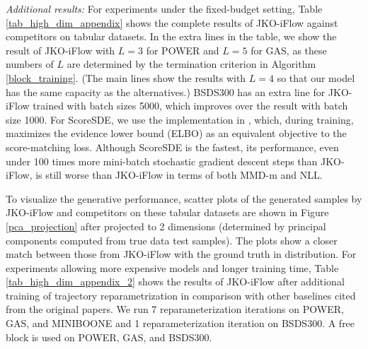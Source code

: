 \documentclass{article}
\theoremstyle{remark}
\theoremstyle{plain}
\newcommand{\JKO}{JKO-iFlow}
\begin{document}
{%
\begin{table}[!b]
\begin{center}
\caption{
NLL per noise scheduler and $\bar{\beta}_{\max}$ combination of ScoreSDE on MINIBOONE. The three settings ``linear, constant, quadratic'' follow the DDPM suggestion \citep{ho2020denoising}. The mean and standard deviation are computed over three replicas of the trained model.
}
\label{tab_noise_schedule}
\def\arraystretch{1}
\end{center}
\end{table}

\vspace{5pt}
\noindent 
\textit{Additional results:}
%
For experiments under the fixed-budget setting, 
Table \ref{tab_high_dim_appendix} shows the complete results of \JKO{} against competitors on tabular datasets.
%
In the extra lines in the table,
we show the result of \JKO{} with $L=3$ for POWER
and $L=5$ for GAS, as these numbers of $L$ are determined by the termination criterion in Algorithm \ref{block_training}.
(The main lines show the results with $L=4$ so that our model has the same capacity as the alternatives.)
BSDS300 has an extra line for \JKO{} trained with batch sizes 5000,
which improves over the result with batch size 1000.
%
For ScoreSDE, we use the implementation in \citep{huang2021variational}, which, during training, maximizes the evidence lower bound (ELBO) as an equivalent objective to the score-matching loss.
%
Although ScoreSDE is the fastest, its performance, even under 100 times more mini-batch stochastic gradient descent steps than JKO-iFlow, is still worse than \JKO{} in terms of both MMD-m and NLL.

%
To visualize the generative performance, scatter plots of the generated samples by \JKO{} and competitors on these tabular datasets are shown in Figure \ref{pca_projection} after projected to 2 dimensions (determined by principal components computed from true data test samples). The plots show a closer match between those from \JKO{} with the ground truth in distribution.
%
For experiments allowing more expensive models and longer training time, Table \ref{tab_high_dim_appendix_2} shows the results of \JKO{} after additional training of trajectory reparametrization
in comparison with other baselines cited from the original papers.
We run 7 reparameterization iterations on POWER, GAS, and MINIBOONE and 1 reparameterization iteration on BSDS300. A free block is used on POWER, GAS, and BSDS300.

}
\end{document}

